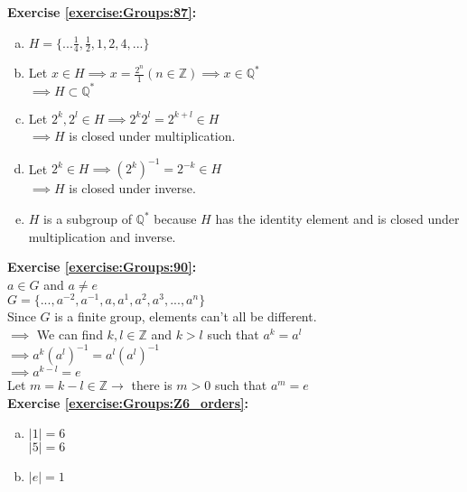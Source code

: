 \noindent\textbf{Exercise \ref{exercise:Groups:87}:}
\begin{enumerate}[(a)]
\item
$H=\{...\displaystyle\frac{1}{4},\frac{1}{2},1,2,4,...\}$

\item
Let $x\in H\implies x=\displaystyle\frac{2^n}{1}(n\in {\mathbb Z})\implies x\in {\mathbb Q}^*$\\
$\implies H\subset {\mathbb Q}^*$

\item
Let $2^k,2^l\in H\implies 2^k2^l=2^{k+l}\in H$\\
$\implies H$ is closed under multiplication.

\item
Let $2^k\in H\implies (2^k)^{-1}=2^{-k}\in H$\\
$\implies H$ is closed under inverse.

\item
$H$ is a subgroup of ${\mathbb Q}^*$ because $H$ has the identity element and is closed under multiplication and inverse.
\end{enumerate}

\noindent\textbf{Exercise \ref{exercise:Groups:90}:}\\
$a\in G$ and $a\neq e$\\
$G=\{...,a^{-2},a^{-1},a,a^1,a^2,a^3,...,a^n\}$\\
Since $G$ is a finite group, elements can't all be different.\\
$\implies$  We can find $k,l\in {\mathbb Z}$ and $k>l$ such that $a^k=a^l$\\
$\implies a^k(a^l)^{-1}=a^l(a^l)^{-1}$\\
$\implies a^{k-l}=e$\\
Let $m=k-l\in {\mathbb Z}\to$ there is $m>0$ such that $a^m=e$\\

\noindent\textbf{Exercise \ref{exercise:Groups:Z6_orders}:}
\begin{enumerate}[(a)]
\item
$|1|=6$\\
$|5|=6$

\item
 $|e|=1$
\end{enumerate}

